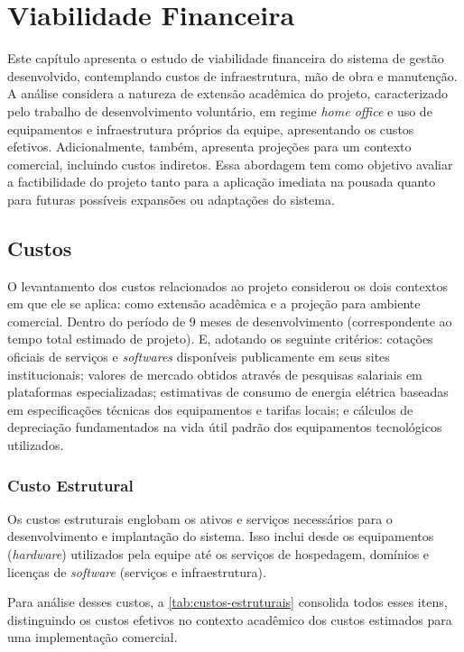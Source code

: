 \documentclass[
	12pt,				%
	openany,			%
	oneside,			%
	a4paper,			%
	english,			%
	french,				%
	spanish,			%
	brazil				%
	]{abntex2}
\begin{document}
\chapter{Viabilidade Financeira}
Este capítulo apresenta o estudo de viabilidade financeira do sistema de gestão desenvolvido, contemplando custos de infraestrutura, mão de obra e manutenção. A análise considera a natureza de extensão acadêmica do projeto, caracterizado pelo trabalho de desenvolvimento voluntário, em regime \textit{home office} e uso de equipamentos e infraestrutura próprios da equipe, apresentando os custos efetivos. Adicionalmente, também, apresenta projeções para um contexto comercial, incluindo custos indiretos. Essa abordagem tem como objetivo avaliar a factibilidade do projeto tanto para a aplicação imediata na pousada quanto para futuras possíveis expansões ou adaptações do sistema.


\section{Custos} 
O levantamento dos custos relacionados ao projeto considerou os dois contextos em que ele se aplica: como extensão acadêmica e a projeção para ambiente comercial. Dentro do período de 9 meses de desenvolvimento (correspondente ao tempo total estimado de projeto). E, adotando os seguinte critérios: cotações oficiais de serviços e \textit{softwares} disponíveis publicamente em seus sites institucionais; valores de mercado obtidos através de pesquisas salariais em plataformas especializadas; estimativas de consumo de energia elétrica baseadas em especificações técnicas dos equipamentos e tarifas locais; e cálculos de depreciação fundamentados na vida útil padrão dos equipamentos tecnológicos utilizados.


\subsection{Custo Estrutural}
Os custos estruturais englobam os ativos e serviços necessários para o desenvolvimento e implantação do sistema. Isso inclui desde os equipamentos (\textit{hardware}) utilizados pela equipe até os serviços de hospedagem, domínios e licenças de \textit{software} (serviços e infraestrutura).

Para análise desses custos, a \autoref{tab:custos-estruturais} consolida todos esses itens, distinguindo os custos efetivos no contexto acadêmico dos custos estimados para uma implementação comercial.
\end{document}
